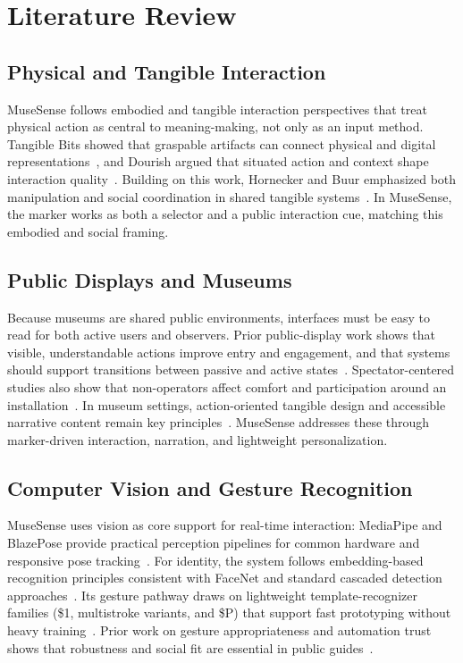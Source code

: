 \documentclass[conference]{IEEEtran}
\begin{document}
\section{Literature Review}
\subsection{Physical and Tangible Interaction}
MuseSense follows embodied and tangible interaction perspectives that treat physical action as central to meaning-making, not only as an input method. Tangible Bits showed that graspable artifacts can connect physical and digital representations~\cite{ishii1997}, and Dourish argued that situated action and context shape interaction quality~\cite{dourish2001}. Building on this work, Hornecker and Buur emphasized both manipulation and social coordination in shared tangible systems~\cite{horneckerbuur2006}. In MuseSense, the marker works as both a selector and a public interaction cue, matching this embodied and social framing.

\subsection{Public Displays and Museums}
Because museums are shared public environments, interfaces must be easy to read for both active users and observers. Prior public-display work shows that visible, understandable actions improve entry and engagement, and that systems should support transitions between passive and active states~\cite{brignull2003,muller2010}. Spectator-centered studies also show that non-operators affect comfort and participation around an installation~\cite{reeves2005}. In museum settings, action-oriented tangible design and accessible narrative content remain key principles~\cite{horneckerstifter2006,pietroni2021}. MuseSense addresses these through marker-driven interaction, narration, and lightweight personalization.

\subsection{Computer Vision and Gesture Recognition}
MuseSense uses vision as core support for real-time interaction: MediaPipe and BlazePose provide practical perception pipelines for common hardware and responsive pose tracking~\cite{lugaresi2019,bazarevsky2020}. For identity, the system follows embedding-based recognition principles consistent with FaceNet and standard cascaded detection approaches~\cite{schroff2015,zhang2016}. Its gesture pathway draws on lightweight template-recognizer families (\$1, multistroke variants, and \$P) that support fast prototyping without heavy training~\cite{wobbrock2007,anthony2010,vatavu2012}. Prior work on gesture appropriateness and automation trust shows that robustness and social fit are essential in public guides~\cite{rico2010,hoff2015}.
\end{document}
